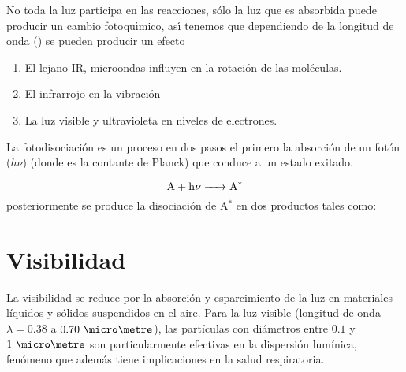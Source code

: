 No toda la luz participa en las reacciones, s\'olo la luz que es absorbida puede producir un cambio fotoqu\'{\i}mico, as\'{\i} tenemos que dependiendo de la longitud de onda () se pueden producir un efecto
\begin{enumerate}
\item El lejano IR, microondas influyen en la rotaci\'on de las mol\'eculas.
\item El infrarrojo en la vibraci\'on
\item La luz visible y ultravioleta en niveles de electrones.
\end{enumerate}

La fotodisociaci\'on es un proceso en dos pasos el primero la absorci\'on de un fot\'on ($h\nu$) (donde    es la contante de Planck) que conduce a un estado exitado.

 \begin{equation*}
\ce{A + h{\nu}    -> A^* } \end{equation*}
posteriormente se produce la disociaci\'on de A$^*$ en dos productos tales como:
 

\section{Visibilidad}\label{vis2}

La visibilidad se reduce por la absorción y esparcimiento de la luz en materiales líquidos y sólidos suspendidos en el aire. Para la luz visible (longitud de onda $\lambda = 0.38$ a $0.70\ \micro\metre$), las partículas con diámetros entre $0.1$ y $1\ \micro\metre$ son particularmente efectivas en la dispersión lumínica, fenómeno que además tiene implicaciones en la salud respiratoria.


